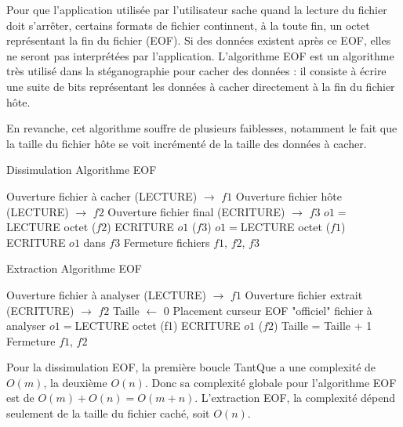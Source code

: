 \documentclass[11pt]{article}
\begin{document}
Pour que l'application utilisée par l'utilisateur sache quand la lecture du
fichier doit s'arrêter, certains formats de fichier continnent, à la toute fin,
un octet représentant la fin du fichier (EOF). Si des données existent après ce
EOF, elles ne seront pas interprétées par l'application. L'algorithme EOF est un
algorithme très utilisé dans la stéganographie pour cacher des données : il
consiste à écrire une suite de bits représentant les données à cacher
directement à la fin du fichier hôte.

En revanche, cet algorithme souffre de plusieurs faiblesses, notamment 
le fait que la taille du fichier hôte se voit incrémenté de la taille 
des données à cacher.

\begin{minipage}{.5\textwidth}
\begin{algorithm}[H]
\caption{Dissimulation Algorithme EOF}
\begin{algorithmic}
\STATE \footnotesize Ouverture fichier à cacher (LECTURE) $\rightarrow$ $f1$
\STATE Ouverture fichier hôte (LECTURE) $\rightarrow$ $f2$
\STATE Ouverture fichier final (ECRITURE) $\rightarrow$ $f3$
\STATE $o1 = $LECTURE octet ($f2$)
\STATE ECRITURE $o1$ ($f3$)
\ENDWHILE
{}
\STATE $o1 =$LECTURE octet ($f1$)
\STATE ECRITURE $o1$ dans $f3$
\ENDWHILE
\STATE Fermeture fichiers $f1$, $f2$, $f3$
\end{algorithmic}
\end{algorithm}
\normalsize
\end{minipage}
\begin{minipage}{.5\textwidth}
\begin{algorithm}[H]
\caption{Extraction Algorithme EOF}
\begin{algorithmic}
\STATE \footnotesize Ouverture fichier à analyser (LECTURE) $\rightarrow$ $f1$
\STATE Ouverture fichier extrait (ECRITURE) $\rightarrow$ $f2$
\STATE Taille $\leftarrow$ 0
\STATE Placement curseur EOF "officiel" fichier à analyser
\STATE $o1 = $LECTURE octet (f1)
\STATE ECRITURE $o1$ ($f2$)
\STATE Taille = Taille + 1
\ENDWHILE
\STATE Fermeture $f1$, $f2$
\end{algorithmic}
\end{algorithm}
\normalsize
\end{minipage}

Pour la dissimulation EOF, la première boucle TantQue a une complexité de $O(m)$, 
la deuxième $O(n)$. \newline Donc sa complexité globale pour l'algorithme 
EOF est de $O(m)+O(n)=O(m+n)$. \newline
L'extraction EOF, la complexité dépend seulement de la taille du fichier 
caché, soit $O(n)$.
\end{document}

